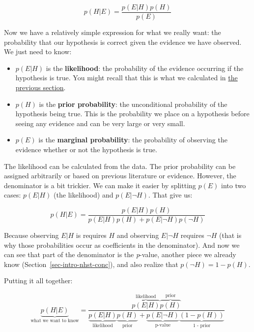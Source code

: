 \documentclass[
  13,
  letterpaper,
]{report}
\providecommand{\tightlist}{%
  \setlength{\itemsep}{0pt}\setlength{\parskip}{0pt}}
\begin{document}
\[p\left(H|E\right)=\frac{p\left(E|H\right)p\left(H\right)}{p\left(E\right)}\]

Now we have a relatively simple expression for what we really want: the
probability that our hypothesis is correct given the evidence we have
observed. We just need to know:

\begin{itemize}
\tightlist
\item
  \(p\left(E|H\right)\) is the \textbf{likelihood}: the probability of
  the evidence occurring if the hypothesis is true. You might recall
  that this is what we calculated in \href{sec-intro-mle}{the previous
  section}.
\item
  \(p\left(H\right)\) is the \textbf{prior probability}: the
  unconditional probability of the hypothesis being true. This is the
  probability we place on a hypothesis before seeing any evidence and
  can be very large or very small.
\item
  \(p\left(E\right)\) is the \textbf{marginal probability}: the
  probability of observing the evidence whether or not the hypothesis is
  true.
\end{itemize}

The likelihood can be calculated from the data. The prior probability
can be assigned arbitrarily or based on previous literature or evidence.
However, the denominator is a bit trickier. We can make it easier by
splitting \(p\left(E\right)\) into two cases: \(p\left(E|H\right)\) (the
likelihood) and \(p\left(E|\lnot H\right)\). That give us:

\[p\left(H|E\right)=\frac{p\left(E|H\right)p\left(H\right)}{p\left(E|H\right)p\left(H\right)+p\left(E|\lnot H\right)p\left(\lnot H\right)}\]

Because observing \(E|H\) is requires \(H\) and observing \(E|\lnot H\)
requires \(\lnot H\) (that is why those probabilities occur as
coefficients in the denominator). And now we can see that part of the
denominator is the \emph{p}-value, another piece we already know
(Section~\ref{sec-intro-nhst-conc}), and also realize that
\(p\left(\lnot H\right)=1-p\left(H\right)\).

Putting it all together:

\[
\underbrace{p\left(H|E\right)}_{\text{what we want to know}}
=
\frac{
  \overbrace{p\left(E|H\right)}^{\text{likelihood}}
  \overbrace{p\left(H\right)}^{\text{prior}}
}{
  \underbrace{p\left(E|H\right)}_{\text{likelihood}}
  \underbrace{p\left(H\right)}_{\text{prior}}
  +
  \underbrace{p\left(E|\lnot H\right)}_{\text{p-value}}
  \underbrace{\left(1-p\left(H\right)\right)}_{\text{1 - prior}}
}
\]
\end{document}
